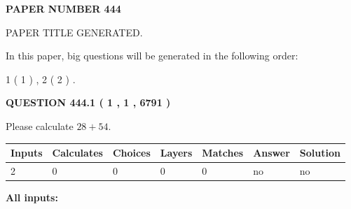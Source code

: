 \documentclass[12pt]{article}
\begin{document}
   
   
   
\newpage 
\setcounter{page}{ 
   444001 } 
   
   
   
   
 {\textbf{ \Large{ PAPER NUMBER  444  }}}
   
   
\vspace{0.2in}
   
   
   
   
   
   
   
   
 \vspace{0.2in}
 
 
 
 
   
   
 PAPER TITLE GENERATED.
   
   
   
\vspace{0.2in}
   
In this paper, big questions will be generated in the following order: 
   
   
   1 ( 1 )
 ,
   2 ( 2 )
 .
  
\vspace{0.2in}
  
{\textbf{\Large{QUESTION
444.1 
 ( 1 , 1 , 6791 )
}}}
  
  
 
Please calculate $ %
28 +  %
54 $.
 
 
   
   
   
   
\noindent\begin{tabular}{|l|l|l|l|l|l|l|}
 \hline
Inputs & Calculates & Choices & Layers & Matches & Answer & Solution \\ \hline
 2  & 
 0  & 
 0
  & 
 0  & 
 0  & 
  no & 
  no 
  \\ \hline
 \end{tabular}
   
   
   
   
\noindent{}
   
   
   
   
\noindent\vspace{0.1in}\hspace{-0.08in} {\textbf{\Large{All inputs: }}}
   
   
  
\end{document}
